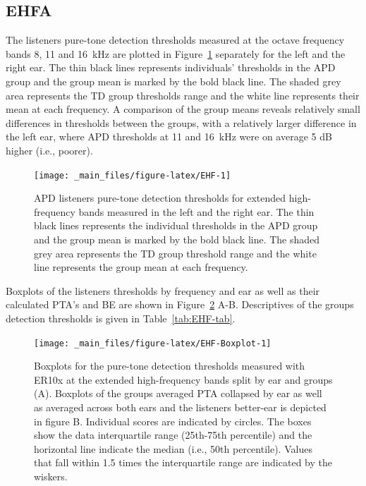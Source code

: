 \documentclass[a4paper, twoside]{templates/ociamthesis}
\begin{document}
\hypertarget{ehfa}{%
\subsection{EHFA}\label{ehfa}}

The listeners pure-tone detection thresholds measured at the octave frequency bands 8, 11 and 16~kHz are plotted in Figure~\ref{fig:EHF} separately for the left and the right ear. The thin black lines represents individuals' thresholds in the APD group and the group mean is marked by the bold black line. The shaded grey area represents the TD group thresholds range and the white line represents their mean at each frequency. A comparison of the group means reveals relatively small differences in thresholds between the groups, with a relatively larger difference in the left ear, where APD thresholds at 11 and 16~kHz were on average 5 dB higher (i.e., poorer).

\begin{figure}

{\centering \texttt{[image: \_main\_files/figure-latex/EHF-1]} 

}

\caption{APD listeners pure-tone detection thresholds for extended high-frequency bands measured in the left and the right ear. The thin black lines represents the individual thresholds in the APD group and the group mean is marked by the bold black line. The shaded grey area represents the TD group threshold range and the white line represents the group mean at each frequency.}\label{fig:EHF}
\end{figure}

Boxplots of the listeners thresholds by frequency and ear as well as their calculated PTA's and BE are shown in Figure~\ref{fig:EHF-Boxplot} A-B. Descriptives of the groups detection thresholds is given in Table~\ref{tab:EHF-tab}.

\begin{figure}

{\centering \texttt{[image: \_main\_files/figure-latex/EHF-Boxplot-1]} 

}

\caption{Boxplots for the pure-tone detection thresholds measured with ER10x at the extended high-frequency bands split by ear and groups (A). Boxplots of the groups averaged PTA collapsed by ear as well as averaged across both ears and the listeners better-ear is depicted in figure B. Individual scores are indicated by circles. The boxes show the data interquartile range (25th-75th percentile) and the horizontal line indicate the median (i.e., 50th percentile). Values that fall within 1.5 times the interquartile range are indicated by the wiskers.}\label{fig:EHF-Boxplot}
\end{figure}
\end{document}
